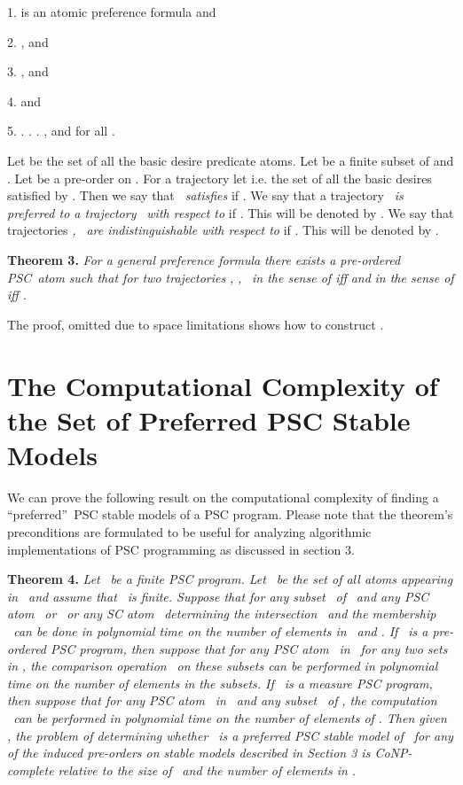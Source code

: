 \documentclass[letterpaper]{article}\usepackage{aaai}
\begin{document}
1.  is an atomic preference formula and 

2. ,  and


3. ,  and


4.  and 

5.  . . . , and for all  . \newline

Let  be the set of all the basic desire predicate atoms. Let  be a
finite subset of  and . Let 
be a pre-order on . For a trajectory  let  i.e. the
set of all the basic desires satisfied by . Then we say that \emph{\ satisfies } if
. We say that a trajectory \emph{\ is preferred to a trajectory }\emph{\ with respect to
} if . This will be denoted by . We say that trajectories \emph{, }\emph{\ are indistinguishable with respect to } if . This
will be denoted by .

\textbf{Theorem 3. }\textit{For a general preference formula }
\textit{there exists a pre-ordered PSC\ atom }\textit{ such that for two trajectories }\textit{, }\textit{, }\textit{\ in the
sense of \cite{SP} iff }\textit{ and }\textit{in the sense of \cite{SP} iff }\textit{.}

The proof, omitted due to space limitations shows how to construct
.

\section{\label{complexity}The Computational Complexity of the Set of
Preferred PSC Stable Models}

We can prove the following result on the computational complexity of finding a
\textquotedblleft preferred\textquotedblright\ PSC stable models of a PSC
program. Please note that the theorem's preconditions are formulated to be
useful for analyzing algorithmic implementations of PSC programming as
discussed in section 3.

\textbf{Theorem 4. }\textit{Let }\textit{\ be a finite PSC program. Let
}\textit{\ be the set of all atoms appearing in }\textit{\ and assume
that }\textit{\ is finite. Suppose that for any subset }\textit{\ of
}\textit{\ and any PSC atom }\textit{\ or }\textit{\ or any SC
atom }\textit{\ determining the intersection
}\textit{\ and the membership }\textit{\ can be done in
polynomial time on the number of elements in }\textit{\ and }\textit{.
If }\textit{\ is a pre-ordered PSC program, then suppose that for any PSC
atom }\textit{\ in }\textit{\ for
any two sets in }\textit{, the comparison operation }\textit{\ on
these subsets can be performed in polynomial time on the number of elements in
the subsets. If }\textit{\ is a measure PSC program, then suppose that for
any PSC atom }\textit{\ in }\textit{\ and any subset }\textit{\ of }\textit{, the computation
}\textit{\ can be performed in polynomial time on
the number of elements of }\textit{. Then given }\textit{,
the problem of determining whether }\textit{\ is a preferred PSC stable
model of }\textit{\ for any of the induced pre-orders on stable models
described in Section 3 is CoNP-complete relative to the size of }\textit{\ and the number of elements in }\textit{.} \newline
\end{document}
